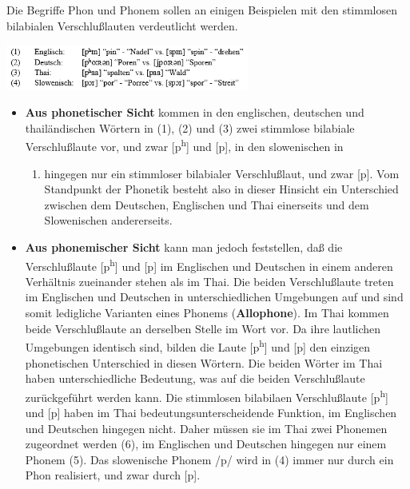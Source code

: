\documentclass[
  letterpaper,
]{scrbook}
\providecommand{\tightlist}{%
  \setlength{\itemsep}{0pt}\setlength{\parskip}{0pt}}\usepackage{longtable,booktabs,array}
\begin{document}
Die Begriffe Phon und Phonem sollen an einigen Beispielen mit den
stimmlosen bilabialen Verschlußlauten verdeutlicht werden.

\includegraphics[width=0.6\textwidth,height=\textheight]{./pictures/01b_NSG_Intro_2020-10-07/phoneme_und_allophone1.png}

\begin{itemize}
\item
  \textbf{Aus phonetischer Sicht} kommen in den englischen, deutschen
  und thailändischen Wörtern in (1), (2) und (3) zwei stimmlose
  bilabiale Verschlußlaute vor, und zwar {[}p\textsuperscript{h}{]} und
  {[}p{]}, in den slowenischen in

  \begin{enumerate}
  \def\labelenumi{(\arabic{enumi})}
  \setcounter{enumi}{3}
  \tightlist
  \item
    hingegen nur ein stimmloser bilabialer Verschlußlaut, und zwar
    {[}p{]}. Vom Standpunkt der Phonetik besteht also in dieser Hinsicht
    ein Unterschied zwischen dem Deutschen, Englischen und Thai
    einerseits und dem Slowenischen andererseits.
  \end{enumerate}
\item
  \textbf{Aus phonemischer Sicht} kann man jedoch feststellen, daß die
  Verschlußlaute {[}p\textsuperscript{h}{]} und {[}p{]} im Englischen
  und Deutschen in einem anderen Verhältnis zueinander stehen als im
  Thai. Die beiden Verschlußlaute treten im Englischen und Deutschen in
  unterschiedlichen Umgebungen auf und sind somit ledigliche Varianten
  eines Phonems (\textbf{Allophone}). Im Thai kommen beide
  Verschlußlaute an derselben Stelle im Wort vor. Da ihre lautlichen
  Umgebungen identisch sind, bilden die Laute {[}p\textsuperscript{h}{]}
  und {[}p{]} den einzigen phonetischen Unterschied in diesen Wörtern.
  Die beiden Wörter im Thai haben unterschiedliche Bedeutung, was auf
  die beiden Verschlußlaute zurückgeführt werden kann. Die stimmlosen
  bilabilaen Verschlußlaute {[}p\textsuperscript{h}{]} und {[}p{]} haben
  im Thai bedeutungsunterscheidende Funktion, im Englischen und
  Deutschen hingegen nicht. Daher müssen sie im Thai zwei Phonemen
  zugeordnet werden (6), im Englischen und Deutschen hingegen nur einem
  Phonem (5). Das slowenische Phonem /p/ wird in (4) immer nur durch ein
  Phon realisiert, und zwar durch {[}p{]}.
\end{itemize}
\end{document}
